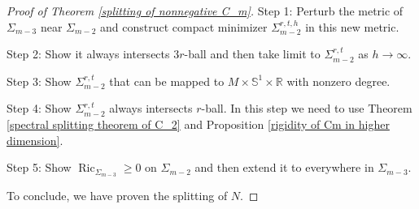 \documentclass[11pt,letterpaper]{amsart}
\DeclareMathOperator{\Ric}{Ric}
\newtheorem{theorem}{Theorem}[section]
\theoremstyle{definition}
\theoremstyle{remark}
\numberwithin{equation}{section}
\begin{document}
\begin{proof}[Proof of Theorem \ref{splitting of nonnegative C_m}]
    Step 1: Perturb the metric of $\Sigma_{m-3}$ near $\Sigma_{m-2}$ and construct compact minimizer $\Sigma^{r,t,h}_{m-2}$ in this new metric.

    Step 2: Show it always intersects $3r$-ball and then take limit to $\Sigma^{r,t}_{m-2}$ as $h\rightarrow \infty.$

    Step 3: Show $\Sigma^{r,t}_{m-2}$ 
    that can be mapped to $M\times \mathbb{S}^1\times \mathbb{R}$ with nonzero degree. 
    
    Step 4: Show $\Sigma^{r,t}_{m-2}$ always intersects $r$-ball. In this step we need to use Theorem \ref{spectral splitting theorem of C_2} and Proposition \ref{rigidity of Cm in higher dimension}. 

    Step 5: Show $\Ric_{\Sigma_{m-3}}\geq 0$ on $\Sigma_{m-2}$ and then extend it to everywhere in $\Sigma_{m-3}.$

    To conclude, we have proven the splitting of $N.$
\end{proof}




\end{document}
